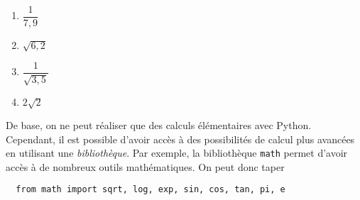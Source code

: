 %
%
%
%
%


  \begin{enumerate}[label=\emph{\alph*)}]
    \item $\dfrac{1}{7,9}$
    \item $\sqrt{6,2}$
    \item $\dfrac{1}{\sqrt{3,5}}$
    \item $2\sqrt{2}$
  \end{enumerate}
De base, on ne peut réaliser que des calculs élémentaires avec Python. Cependant, il est possible d'avoir accès à des possibilités de calcul plus avancées en utilisant une \emph{bibliothèque}. 
Par exemple, la bibliothèque \texttt{math} permet d'avoir accès à de nombreux outils mathématiques. 
On peut donc taper
\begin{lstlisting}
  from math import sqrt, log, exp, sin, cos, tan, pi, e 
\end{lstlisting}

